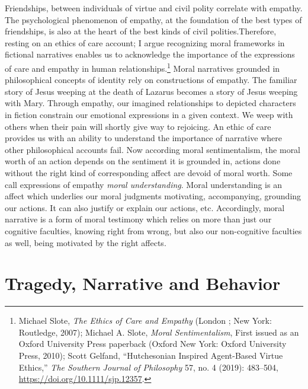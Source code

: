 \documentclass[phdthesis,12pt,final]{wuthesis}
\theoremstyle{definition}
\theoremstyle{definition}
\theoremstyle{definition}
\theoremstyle{definition}
\theoremstyle{remark}
\begin{document}
Friendships, between individuals of virtue and civil polity correlate with empathy. The psychological phenomenon of empathy, at the foundation of the best types of friendships, is also at the heart of the best kinds of civil polities.Therefore, resting on an ethics of care account; I argue recognizing moral frameworks in fictional narratives enables us to acknowledge the importance of the expressions of care and empathy in human relationships.\footnote{Michael Slote, \emph{The {Ethics} of {Care} and {Empathy}} (London ; New York: Routledge, 2007); Michael A. Slote, \emph{Moral {Sentimentalism}}, First issued as an Oxford University Press paperback (Oxford New York: Oxford University Press, 2010); Scott Gelfand, {``Hutchesonian Inspired Agent-Based Virtue Ethics,''} \emph{The Southern Journal of Philosophy} 57, no. 4 (2019): 483--504, \url{https://doi.org/10.1111/sjp.12357}.} Moral narratives grounded in philosophical concepts of identity rely on constructions of empathy. The familiar story of Jesus weeping at the death of Lazarus becomes a story of Jesus weeping with Mary. Through empathy, our imagined relationships to depicted characters in fiction constrain our emotional expressions in a given context. We weep with others when their pain will shortly give way to rejoicing. An ethic of care provides us with an ability to understand the importance of narrative where other philosophical accounts fail. Now according moral sentimentalism, the moral worth of an action depends on the sentiment it is grounded in, actions done without the right kind of corresponding affect are devoid of moral worth. Some call expressions of empathy \emph{moral understanding}. Moral understanding is an affect which underlies our moral judgments motivating, accompanying, grounding our actions. It can also justify or explain our actions, etc. Accordingly, moral narrative is a form of moral testimony which relies on more than just our cognitive faculties, knowing right from wrong, but also our non-cognitive faculties as well, being motivated by the right affects.

\section{Tragedy, Narrative and Behavior}\label{tragedy-narrative-and-behavior}
\end{document}
